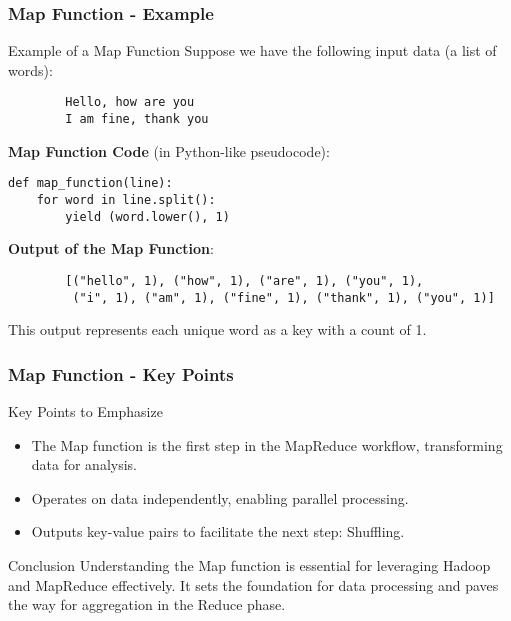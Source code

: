 \documentclass[aspectratio=169]{beamer}
\begin{document}
\begin{frame}[fragile]
    \frametitle{Map Function - Example}
    \begin{block}{Example of a Map Function}
        Suppose we have the following input data (a list of words):
        
        \begin{verbatim}
        Hello, how are you
        I am fine, thank you
        \end{verbatim}

        \textbf{Map Function Code} (in Python-like pseudocode):
        \begin{lstlisting}
def map_function(line):
    for word in line.split():
        yield (word.lower(), 1)
        \end{lstlisting}

        \textbf{Output of the Map Function}:
        
        \begin{verbatim}
        [("hello", 1), ("how", 1), ("are", 1), ("you", 1),
         ("i", 1), ("am", 1), ("fine", 1), ("thank", 1), ("you", 1)]
        \end{verbatim}
        This output represents each unique word as a key with a count of 1.
    \end{block}
\end{frame}

\begin{frame}[fragile]
    \frametitle{Map Function - Key Points}
    \begin{block}{Key Points to Emphasize}
        \begin{itemize}
            \item The Map function is the first step in the MapReduce workflow, transforming data for analysis.
            \item Operates on data independently, enabling parallel processing.
            \item Outputs key-value pairs to facilitate the next step: Shuffling.
        \end{itemize}
    \end{block}

    \begin{block}{Conclusion}
        Understanding the Map function is essential for leveraging Hadoop and MapReduce effectively. It sets the foundation for data processing and paves the way for aggregation in the Reduce phase.
    \end{block}
\end{frame}
\end{document}

